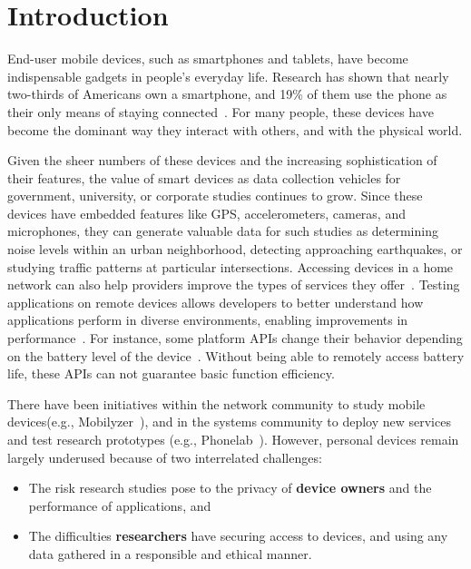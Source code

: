 \section{Introduction}

End-user mobile devices, such as smartphones and tablets, have become
indispensable gadgets in people's everyday life. %
Research has shown that nearly two-thirds of
Americans own a smartphone, and 19\% of them
use the phone as their only means of staying connected~\cite{phone2015}. 
For many people, these devices have become the dominant way they
interact with others, and with the physical world.

Given the sheer numbers of these devices and the increasing
sophistication of their features,
the value of smart devices as data collection vehicles for government,
university, or corporate studies continues to grow. Since
these devices have embedded features like GPS,
accelerometers, cameras, and microphones, they can generate valuable
data for such studies as determining noise levels within an urban
neighborhood, detecting approaching earthquakes, or studying traffic
patterns at particular intersections. Accessing devices in a home
network can also help providers improve the types of services they 
offer~\cite{sundaresan2011broadband}. Testing applications on remote
devices allows developers to better understand how applications 
perform in diverse environments, enabling improvements in 
performance~\cite{ravindranath2012appinsight}. For instance, 
some platform APIs change their behavior depending 
on the battery level of the device~\cite{battery}. Without being able to remotely access battery life, these APIs can not guarantee basic function efficiency.

There have been initiatives within the network
community to study mobile devices(e.g.,
Mobilyzer~\cite{nikravesh2015mobilyzer}), and in the systems community
to deploy new services and test research prototypes (e.g.,
Phonelab~\cite{phonelab, nandugudi2013phonelab}). However, personal devices
remain largely underused because of two interrelated challenges:

\begin{itemize}
\item The risk research studies pose to the privacy of \textbf{device 
owners} and the performance of applications, and 

\item The difficulties \textbf{researchers} have
securing access to devices, and using any data gathered in a
responsible and ethical manner. 
\end{itemize}
					
